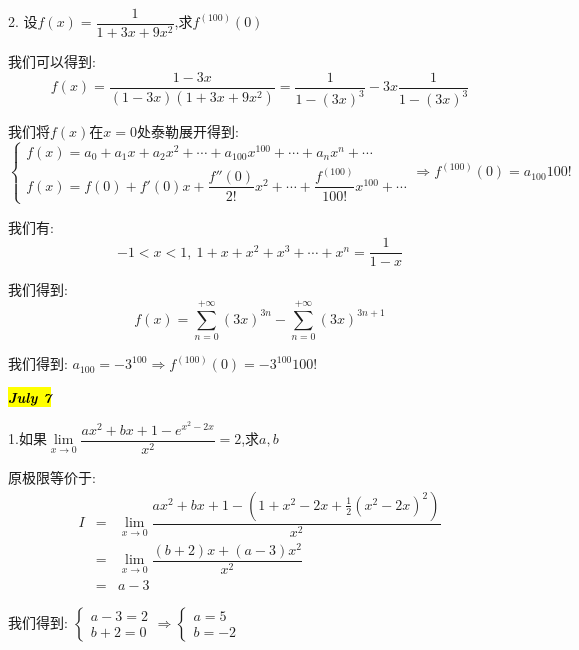 2. 设$f(x)=\dfrac{1}{1+3x+9x^2}$,求$f^{(100)}(0)$
\begin{solution}
	
	我们可以得到: 
	$$f(x)=\dfrac{1-3x}{(1-3x)(1+3x+9x^2)}=\dfrac{1}{1-(3x)^3}-3x\dfrac{1}{1-(3x)^3}$$
	
	我们将$f(x)$在$x=0$处泰勒展开得到: 
	$$\left\lbrace
	\begin{array}{l}
		f(x)=a_{0}+a_{1}x+a_{2}x^2+\cdots+a_{100}x^{100}+\cdots+a_{n}x^{n}+\cdots\\
		f(x)=f(0)+f'(0)x+\dfrac{f''(0)}{2!}x^2+\cdots+\dfrac{f^{(100)}}{100!}x^{100}+\cdots
	\end{array}
	\right. \Rightarrow f^{(100)}(0)=a_{100}100!$$
	
	我们有: $$-1<x<1,\ 1+x+x^2+x^3+\cdots+x^n=\dfrac{1}{1-x}$$
	
	我们得到: 
	$$f(x)=\sum\limits_{n=0}^{+\infty}(3x)^{3n}-\sum\limits_{n=0}^{+\infty}(3x)^{3n+1}$$
	
	我们得到: $a_{100}=-3^{100}\Rightarrow f^{(100)}(0)=-3^{100}100!$
\end{solution}

\hl{\textbf{\textit{July 7}}}

1.如果$\lim\limits_{x\rightarrow 0}\dfrac{ax^2+bx+1-e^{x^2-2x}}{x^2}=2$,求$a,b$
\begin{solution}
	
	原极限等价于: 
	\begin{eqnarray*}
		I&=&\lim\limits_{x\rightarrow 0}\dfrac{ax^2+bx+1-(1+x^2-2x+\frac{1}{2}(x^2-2x)^2)}{x^2}\\
		&=&\lim\limits_{x\rightarrow 0}\dfrac{(b+2)x+(a-3)x^2}{x^2}\\
		&=&a-3
	\end{eqnarray*}
	
	我们得到: $\left\lbrace
	\begin{array}{l}
		a-3=2\\
		b+2=0
	\end{array}
	\right. \Rightarrow \left\lbrace
	\begin{array}{l}
		a=5\\
		b=-2
	\end{array}
	\right. $
\end{solution}

